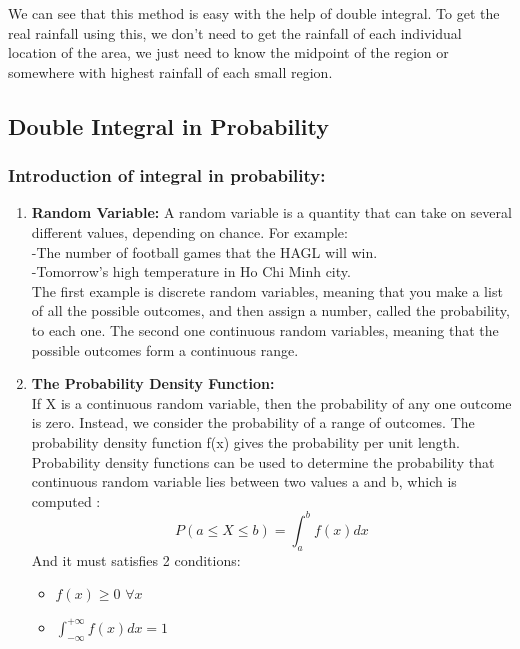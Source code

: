 \documentclass[a4paper]{article}
\begin{document}
We can see that this method is easy with the help of double integral. To get the real rainfall using this, we don't need to get the rainfall of each individual location of the area, we just need to know the midpoint of the region or somewhere with highest rainfall of each small region.

\newpage
{}
\subsection{Double Integral in Probability}
\subsubsection*{Introduction of integral in probability:}
\begin{enumerate}
	\item \textbf{Random Variable:} A random variable is a quantity that can take on several different values, depending on chance. For example: \\
	      -The number of football games that the HAGL will win. \\
	      -Tomorrow's high temperature in Ho Chi Minh city. \\
	      The first example is discrete random variables, meaning that you make a list of all the possible outcomes, and then assign a number, called the probability, to each one. The second one continuous random variables, meaning that the possible outcomes form a continuous range.
	\item \textbf{The Probability Density Function:} \\
	      If X is a continuous random variable, then the probability of any one outcome is zero. Instead, we consider the probability of a range of outcomes. The probability density function f(x) gives the probability per unit length. \\
	      Probability density functions can be used to determine the probability that continuous random variable lies between two values a and b, which is computed :
	      \begin{equation*}
		      P ( a \leq X \leq b) = \int_{a}^{b} f(x) dx
	      \end{equation*}
	      And it must satisfies 2 conditions:
	      \begin{itemize}
		      \item $f(x) \geq 0$ $\forall x $
		      \item $\int_{-\infty}^{+\infty} f(x) dx = 1$

\end{itemize}
\end{enumerate}
\end{document}
